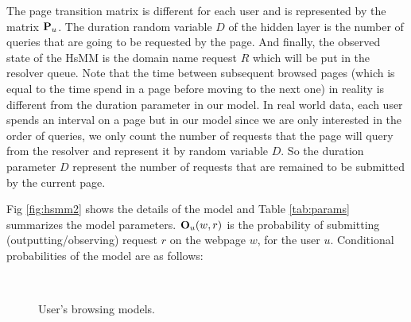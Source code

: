 \documentclass[conference]{IEEEtran}
\begin{document}
	The page transition matrix is different for each user and is represented by the matrix $\P_u$. 
	The duration random variable $D$ of the hidden layer is the number of queries that are going to be requested by the page. 
	And finally, the observed state of the HsMM is the domain name request $R$ which will be put in the resolver queue. 
	Note that the time between subsequent browsed pages (which is equal to the time spend in a page before moving to the next one) in reality is different from the duration parameter in our model.
	In real world data, each user spends an interval on a page but in our model since we are only interested in the order of queries, we only count the number of requests that the page will query from the resolver and represent it by random variable $D$.
	So the duration parameter $D$ represent the number of requests that are remained to be submitted by the current page.
	
	
	Fig \ref{fig:hsmm2} shows the details of the model and Table \ref{tab:params} summarizes the model parameters.
	$\O_u(w, r)$  is the probability of submitting (outputting/observing) request $r$ on the webpage $w$, for the user $u$.	
	Conditional probabilities of the model are as follows:	
	\begin{figure}
	\centering
	~
	~
	\caption{User's browsing models.}
	\label{fig:hsmm}
\end{figure}	
	
\end{document}

